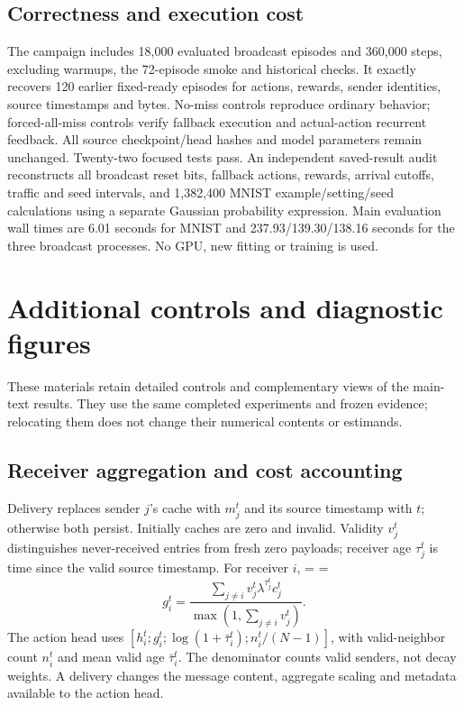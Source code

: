 \documentclass[pdflatex,sn-mathphys-num]{sn-jnl}
\begin{document}
\subsection{Correctness and execution cost}
The campaign includes 18,000 evaluated broadcast episodes and 360,000 steps, excluding warmups, the 72-episode smoke and historical checks. It exactly recovers 120 earlier fixed-ready episodes for actions, rewards, sender identities, source timestamps and bytes. No-miss controls reproduce ordinary behavior; forced-all-miss controls verify fallback execution and actual-action recurrent feedback. All source checkpoint/head hashes and model parameters remain unchanged. Twenty-two focused tests pass. An independent saved-result audit reconstructs all broadcast reset bits, fallback actions, rewards, arrival cutoffs, traffic and seed intervals, and 1,382,400 MNIST example/setting/seed calculations using a separate Gaussian probability expression. Main evaluation wall times are 6.01 seconds for MNIST and 237.93/139.30/138.16 seconds for the three broadcast processes. No GPU, new fitting or training is used.

\FloatBarrier
\section{Additional controls and diagnostic figures}\label{app:additional_controls}
These materials retain detailed controls and complementary views of the main-text results. They use the same completed experiments and frozen evidence; relocating them does not change their numerical contents or estimands.
\subsection{Receiver aggregation and cost accounting}
Delivery replaces sender $j$'s cache with $m_j^t$ and its source timestamp with $t$; otherwise both persist. Initially caches are zero and invalid. Validity $v_j^t$ distinguishes never-received entries from fresh zero payloads; receiver age $\tau_j^t$ is time since the valid source timestamp. For receiver $i$,
\begingroup
\makeatletter\@fleqnfalse\makeatother
\abovedisplayshortskip=\abovedisplayskip
\belowdisplayshortskip=\belowdisplayskip
\begin{equation}
 g_i^t=\frac{\sum_{j\ne i}v_j^t\lambda^{\tau_j^t}c_j^t}{\max(1,\sum_{j\ne i}v_j^t)}.
\end{equation}
\endgroup
The action head uses $[h_i^t;g_i^t;\log(1+\bar\tau_i^t);n_i^t/(N-1)]$, with valid-neighbor count $n_i^t$ and mean valid age $\bar\tau_i^t$. The denominator counts valid senders, not decay weights. A delivery changes the message content, aggregate scaling and metadata available to the action head.
\end{document}
